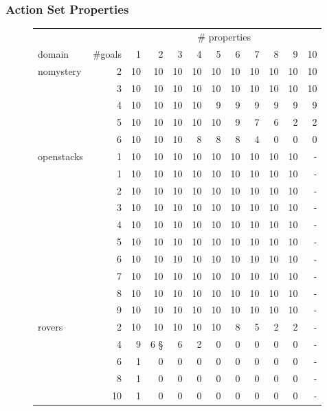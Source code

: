 \FloatBarrier
\newpage
\subsubsection*{Action Set Properties}

\begin{figure}[ht]
	\begin{tabular}{l|r|rrrrrrrrrr}
		& & \multicolumn{10}{c}{\# properties} \\
		domain & \#goals & 1 & 2 & 3 & 4 & 5 & 6 & 7 & 8 & 9 & 10 \\\hline
		nomystery & 2 & 10 & 10 & 10 & 10 & 10 & 10 & 10 & 10 & 10 & 10\\\hline
				& 3 & 10 & 10 & 10 & 10 & 10 & 10 & 10 & 10 & 10 & 10\\\hline
				& 4 & 10 & 10 & 10 & 10 & 9 & 9 & 9 & 9 & 9 & 9\\\hline
				& 5 & 10 & 10 & 10 & 10 & 10 & 9 & 7 & 6 & 2 & 2\\\hline
				& 6 & 10 & 10 & 10 & 8 & 8 & 8 & 4 & 0 & 0 & 0\\\hline\hline
		openstacks & 1 & 10 & 10 & 10 & 10 & 10 & 10 & 10 & 10 & 10 & - \\\hline
				& 1 & 10 & 10 & 10 & 10 & 10 & 10 & 10 & 10 & 10 & - \\\hline
				& 2 & 10 & 10 & 10 & 10 & 10 & 10 & 10 & 10 & 10 & - \\\hline
				& 3 & 10 & 10 & 10 & 10 & 10 & 10 & 10 & 10 & 10 & - \\\hline
				& 4 & 10 & 10 & 10 & 10 & 10 & 10 & 10 & 10 & 10 & - \\\hline
				& 5 & 10 & 10 & 10 & 10 & 10 & 10 & 10 & 10 & 10 & - \\\hline
				& 6 & 10 & 10 & 10 & 10 & 10 & 10 & 10 & 10 & 10 & - \\\hline
				& 7 & 10 & 10 & 10 & 10 & 10 & 10 & 10 & 10 & 10 & - \\\hline
				& 8 & 10 & 10 & 10 & 10 & 10 & 10 & 10 & 10 & 10 & - \\\hline
				& 9 & 10 & 10 & 10 & 10 & 10 & 10 & 10 & 10 & 10 & - \\\hline\hline
		rovers & 2 & 10 & 10 & 10 & 10 & 10 & 8 & 5 & 2 & 2 &- \\\hline
				& 4 & 9 & 6 § & 6 & 2 & 0 & 0 & 0 & 0 & 0 & - \\\hline
				& 6 & 1 & 0 & 0 & 0 & 0 & 0 & 0 & 0 & 0 & - \\\hline 
				& 8 & 1 & 0 & 0 & 0 & 0 & 0 & 0 & 0 & 0 & - \\\hline 
				& 10 & 1 & 0 & 0 & 0 & 0 & 0 & 0 & 0 & 0 & - \\\hline 

\end{tabular}
\end{figure}
